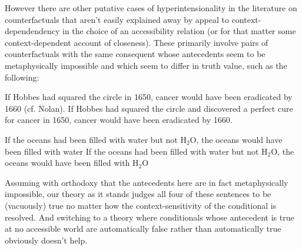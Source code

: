 \documentclass[If.tex]{subfiles}
\begin{document}
However there are other putative cases of hyperintensionality in the literature on counterfactuals that aren't easily explained away by appeal to context-dependendency in the choice of an accessibility relation (or for that matter some context-dependent account of closeness).  These primarily involve pairs of counterfactuals with the same consequent whose antecedents seem to be metaphysically impossible and which seem to differ in truth value, such as the following:
\begin{prop}
	\nitem \label{hobbes}
	\begin{prop}
		\aitem
		If Hobbes had squared the circle in 1650, cancer would have been eradicated by 1660 (cf. Nolan).
		\aitem
		If Hobbes had squared the circle and discovered a perfect cure for cancer in 1650, cancer would have been eradicated by 1660.  
	\end{prop}
	\nitem \label{water}
	\begin{prop}
		\aitem
		If the oceans had been filled with water but not H$_2$O, the oceans would have been filled with water
		\aitem
		If the oceans had been filled with water but not H$_2$O, the oceans would have been filled with H$_2$O
	\end{prop}
\end{prop}
Assuming with orthodoxy that the antecedents here are in fact metaphysically impossible, our theory as it stands judges all four of these sentences to be (vacuously) true no matter how the context-sensitivity of the conditional is resolved.  And switching to a theory where conditionals whose antecedent is true at no accessible world are automatically false rather than automatically true obviously doesn't help.  %
\end{document}
